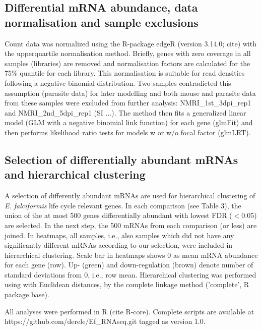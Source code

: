 \documentclass{bmcart}
\begin{document}
\subsection{Differential mRNA abundance, data normalisation and sample exclusions}
Count data was normalized using the R-package edgeR (version 3.14.0;
cite) with the upperquartile normalisation method. Briefly, genes with
zero coverage in all samples (libraries) are removed and normalisation
factors are calculated for the 75\% quantile for each library. This
normalisation is suitable for read densities following a negative
binomial distribution. Two samples contradicted this assumption
(parasite data) for later modelling and both mouse and parasite data
from these samples were excluded from further analysis:
NMRI\_1st\_3dpi\_rep1 and NMRI\_2nd\_5dpi\_rep1 (SI ...). The method
then fits a generalized linear model (GLM with a negative binomial
link function) for each gene (glmFit) and then performs likelihood
ratio tests for models w or w/o focal factor (glmLRT).

\subsection{Selection of differentially abundant mRNAs and hierarchical clustering}
A selection of differently abundant mRNAs are used for hierarchical
clustering of \textit{E. falciformis} life cycle relevant genes. In
each comparison (see Table 3), the union of the at most 500 genes
differentially abundant with lowest FDR ($<$0.05) are selected. In the
next step, the 500 mRNAs from each comparison (or less) are
joined. In heatmaps, all samples, i.e., also samples which did not have any
significantly different mRNAs according to our selection, were
included in hierarchical clustering. Scale bar in heatmaps shows 0 as
mean mRNA abundance for each gene (row). Up- (green) and
down-regulation (brown) denote number of standard deviations from 0,
i.e., row mean. Hierarchical clustering was performed using with
Euclidean distances, by the complete linkage method ('complete', R package
base).

All analyses were performed in R (cite R-core). Complete scripts are
available at https://github.com/derele/Ef\_RNAseq.git tagged as version
1.0.
\end{document}
